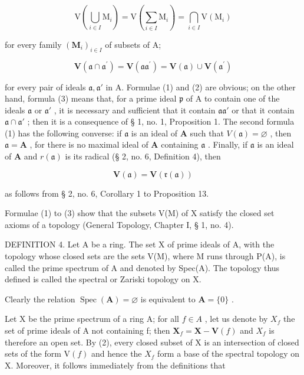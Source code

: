 \[
\mathrm{V} \left(\bigcup_ {i \in I} \mathrm{M} _ {i}\right) = \mathrm{V} \left(\sum_ {i \in I} \mathrm{M} _ {i}\right) = \bigcap_ {i \in I} \mathrm{V} (\mathrm{M} _ {i})\tag{2}
\]

for every family \((\mathbf{M}_i)_{i\in I}\) of subsets of A;

\[
\mathbf {V} (\mathfrak {a} \cap \mathfrak {a} ^ {\prime}) = \mathbf {V} (\mathfrak {a a} ^ {\prime}) = \mathbf {V} (\mathfrak {a}) \cup \mathbf {V} (\mathfrak {a} ^ {\prime})\tag{3}
\]

for every pair of ideals \(\mathfrak{a},\mathfrak{a}'\) in A. Formulae (1) and (2) are obvious; on the other hand, formula (3) means that, for a prime ideal \(\mathfrak{p}\) of A to contain one of the ideals \(\mathfrak{a}\) or \(\mathfrak{a}'\) , it is necessary and sufficient that it contain \(\mathfrak{a}\mathfrak{a}'\) or that it contain \(\mathfrak{a} \cap \mathfrak{a}'\) ; then it is a consequence of § 1, no. 1, Proposition 1. The second formula (1) has the following converse: if \(\mathfrak{a}\) is an ideal of \(\mathbf{A}\) such that \(V(\mathfrak{a}) = \varnothing\) , then \(\mathfrak{a} = \mathbf{A}\) , for there is no maximal ideal of \(\mathbf{A}\) containing \(\mathfrak{a}\) . Finally, if \(\mathfrak{a}\) is an ideal of \(\mathbf{A}\) and \(r(\mathfrak{a})\) is its radical (§ 2, no. 6, Definition 4), then

\[
\mathbf {V} (\mathfrak {a}) = \mathbf {V} (\mathfrak {r} (\mathfrak {a}))\tag{4}
\]

as follows from § 2, no. 6, Corollary 1 to Proposition 13.

Formulae (1) to (3) show that the subsets V(M) of X satisfy the closed set axioms of a topology (General Topology, Chapter I, § 1, no. 4).

DEFINITION 4. Let A be a ring. The set X of prime ideals of A, with the topology whose closed sets are the sets V(M), where M runs through P(A), is called the prime spectrum of A and denoted by Spec(A). The topology thus defined is called the spectral or Zariski topology on X.

Clearly the relation \(\operatorname{Spec}(\mathbf{A}) = \varnothing\) is equivalent to \(\mathbf{A} = \{0\}\) .

Let X be the prime spectrum of a ring A; for all \(f \in A\) , let us denote by \(X_{f}\) the set of prime ideals of A not containing f; then \(\mathbf{X}_{f} = \mathbf{X} - \mathbf{V}(f)\) and \(X_{f}\) is therefore an open set. By (2), every closed subset of X is an intersection of closed sets of the form \(\mathrm{V}(f)\) and hence the \(X_{f}\) form a base of the spectral topology on X. Moreover, it follows immediately from the definitions that

